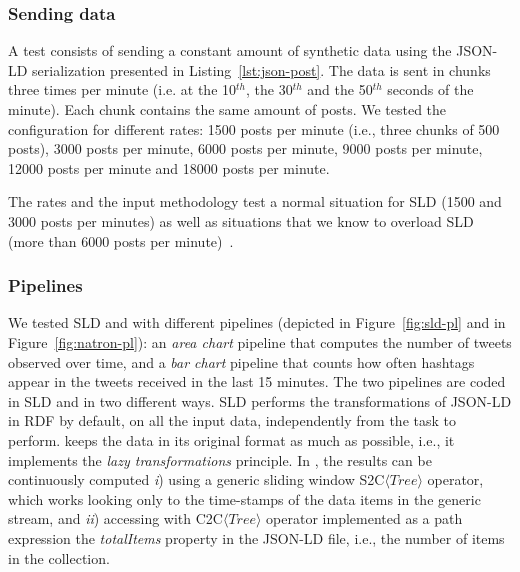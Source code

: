 \subsubsection{Sending data} 
A test consists of sending a constant amount of synthetic data using the JSON-LD serialization presented in Listing~\ref{lst:json-post}.
The data is sent in chunks three times per minute (i.e. at the 10$^{th}$, the 30$^{th}$ and the 50$^{th}$ seconds of the minute).  Each chunk contains the same amount of posts. We tested the configuration for different rates: 1500 posts per minute (i.e., three chunks of 500 posts), 3000 posts per minute, 6000 posts per minute, 9000 posts per minute, 12000 posts per minute and 18000 posts per minute.

The rates and the input methodology test a normal situation for SLD (1500 and 3000 posts per minutes) as well as situations that we know to overload SLD (more than 6000 posts per minute)~\cite{DBLP:conf/esws/BalduiniV017a}.

\subsubsection{Pipelines}

We tested SLD and \sti{} with different pipelines (depicted in Figure~\ref{fig:sld-pl} and in Figure~\ref{fig:natron-pl}): an \textit{area chart} pipeline that computes the number of tweets observed over time, and a \textit{bar chart} pipeline that counts how often hashtags appear in the tweets received in the last 15 minutes.
The two pipelines are coded in SLD and \sti{} in two different ways. 
SLD performs the transformations of JSON-LD in RDF by default, on all the input data, independently from the task to perform. \sti{} keeps the data in its original format as much as possible, i.e., it implements the \textit{lazy transformations} principle.
In \sti{}, the results can be continuously computed \textit{i}) using a generic sliding window S2C$\langle Tree \rangle$ operator, which works looking only to the time-stamps of the data items in the generic stream, and \textit{ii}) accessing with C2C$\langle Tree \rangle$ operator implemented as a path expression the \textit{totalItems} property in the JSON-LD file, i.e., the number of items in the collection.

